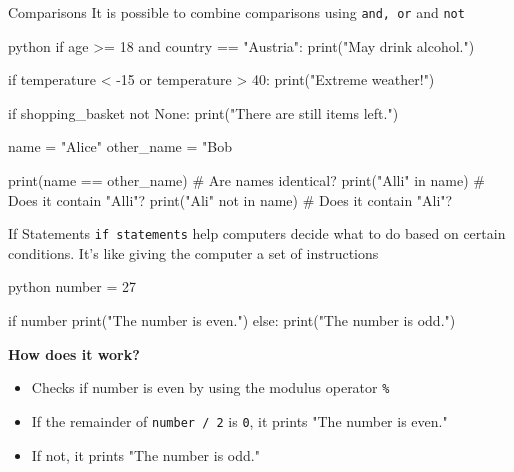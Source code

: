 \documentclass[
	11pt, 
]{beamer}
\begin{document}

\begin{frame}[fragile]{Comparisons}
It is possible to combine comparisons using \texttt{and, or} and \texttt{not}

\begin{mintedbox}{python}
if age >= 18 and country == "Austria":
    print("May drink alcohol.")

if temperature < -15 or temperature > 40:
    print("Extreme weather!")

if shopping_basket not None:
    print("There are still items left.")

name = "Alice"
other_name = "Bob

print(name == other_name) # Are names identical?
print("Alli" in name)     # Does it contain "Alli"?
print("Ali" not in name)  # Does it contain "Ali"?
\end{mintedbox}

\end{frame}


\begin{frame}[fragile]{If Statements}
\texttt{if statements} help computers decide what to do based on certain conditions. It's like giving the computer a set of instructions

\begin{mintedbox}{python}
number = 27 

if number %
    print("The number is even.")
else:
    print("The number is odd.")
\end{mintedbox}

\begin{exampleblock}{\textbf{How does it work?}}
\begin{itemize}

    \item Checks if number is even by using the modulus operator \texttt{\%}
    \item If the remainder of \texttt{number / 2} is \texttt{0}, it prints "The number is even."
    \item If not, it prints "The number is odd."
\end{itemize}
\end{exampleblock}

\end{frame}

\end{document}
